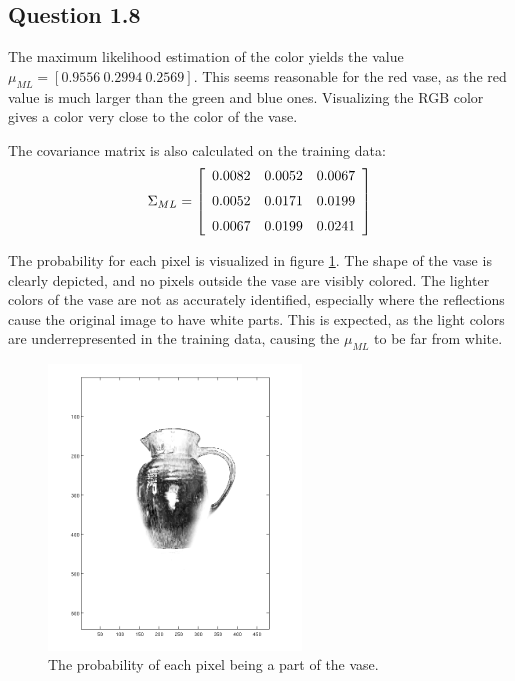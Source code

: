 \documentclass[a4paper, 10pt, final]{article}
\begin{document}


\subsection*{Question 1.8}

The maximum likelihood estimation of the color yields the value $\mu _{ML} = [0.9556~ 0.2994~ 0.2569]$.
This seems reasonable for the red vase, as the red value is much larger than the green and blue ones.
Visualizing the RGB color gives a color very close to the color of the vase.

The covariance matrix is also calculated on the training data:\\
$$\Sigma _{ML} = \left[
\begin {array}{ccc}
0.0082 & 0.0052 & 0.0067\\
\noalign{\medskip}
0.0052 & 0.0171 & 0.0199\\
\noalign{\medskip}
0.0067 & 0.0199 & 0.0241\\
\end {array}
\right]$$

The probability for each pixel is visualized in figure \ref{fig:q1_8}.
The shape of the vase is clearly depicted, and no pixels outside the vase are visibly colored.
The lighter colors of the vase are not as accurately identified, especially where the reflections cause the original image to have white parts.
This is expected, as the light colors are underrepresented in the training data, causing the $\mu _{ML}$ to be far from white.

\begin{figure}[!htpb]
  \centering
  \includegraphics[width=0.6\textwidth]{images/kande1_probebility.png}
  \caption{The probability of each pixel being a part of the vase.}
  \label{fig:q1_8}
\end{figure}
\end{document}
